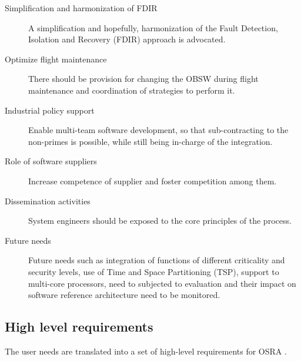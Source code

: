\begin{description}
\item [Simplification and harmonization of FDIR] A simplification and hopefully, harmonization of the Fault Detection, Isolation and Recovery (FDIR) approach is advocated.

\item [Optimize flight maintenance] There should be provision for changing the OBSW during flight maintenance and coordination of strategies to perform it. 

\item [Industrial policy support] Enable multi-team software development, so that sub-contracting to the non-primes is possible, while still being in-charge of the integration.

\item [Role of software suppliers] Increase competence of supplier and foster competition among them. 

\item [Dissemination activities] System engineers should be exposed to the core principles of the process.

\item [Future needs] Future needs such as integration of functions of different criticality and security levels, use of Time and Space Partitioning (TSP), support to multi-core processors, need to subjected to evaluation and their impact on software reference architecture need to be monitored.
\end{description} 

\subsection{High level requirements}
\label{subsection: High level requirements}
The user needs are translated into a set of high-level requirements for OSRA \cite{SAVOIR,PhdThesis}.

